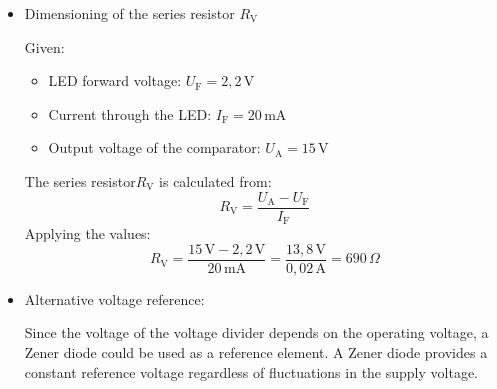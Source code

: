 {\begin{itemize}
    \begin{figure}[H]
        \centering
        
        \label{fig:LsgAkkuUeberwachung1}
    \end{figure}

    \item[c)] Dimensioning of the series resistor $R_\mathrm{V}$

    Given:
    \begin{itemize}
        \item LED forward voltage: $U_\mathrm{F} = 2,2\,\mathrm{V}$
        \item Current through the LED: $I_\mathrm{F} = 20\,\mathrm{mA}$
        \item Output voltage of the comparator: $U_\mathrm{A} = 15\,\mathrm{V}$
    \end{itemize}

    The series resistor$R_\mathrm{V}$ is calculated from:
    \[
    R_\mathrm{V} = \frac{U_\mathrm{A} - U_\mathrm{F}}{I_\mathrm{F}}
    \]
    Applying the values:
    \[
    R_\mathrm{V} = \frac{15\,\mathrm{V} - 2,2\,\mathrm{V}}{20\,\mathrm{mA}} = \frac{13,8\,\mathrm{V}}{0,02\,\mathrm{A}} = 690\,\Omega
    \]

    \begin{figure}[H]
        \centering
        \begin{subfigure}[b]{0.45\textwidth}
            \centering
            
            \label{fig:LsgAkkuUeberwachung2}
        \end{subfigure}
        \hfill
        \begin{subfigure}[b]{0.45\textwidth}
            \centering
            
            \label{fig:LsgAkkuUeberwachung3}
        \end{subfigure}
        \label{fig:BeideLoesungen}
    \end{figure}

    \item[d)] Alternative voltage reference:

    Since the voltage of the voltage divider depends on the operating voltage, a Zener diode could be used as a reference element. A Zener diode provides a constant reference voltage regardless of fluctuations in the supply voltage.


\end{itemize}}
